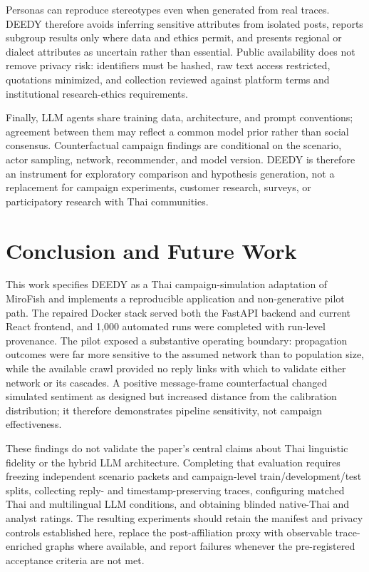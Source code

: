 \documentclass[conference]{IEEEtran}
\begin{document}
Personas can reproduce stereotypes even when generated from real traces.
DEEDY therefore avoids inferring sensitive attributes from isolated posts,
reports subgroup results only where data and ethics permit, and presents
regional or dialect attributes as uncertain rather than essential. Public
availability does not remove privacy risk: identifiers must be hashed, raw
text access restricted, quotations minimized, and collection reviewed against
platform terms and institutional research-ethics requirements.

Finally, LLM agents share training data, architecture, and prompt conventions;
agreement between them may reflect a common model prior rather than social
consensus. Counterfactual campaign findings are conditional on the scenario,
actor sampling, network, recommender, and model version. DEEDY is therefore an
instrument for exploratory comparison and hypothesis generation, not a
replacement for campaign experiments, customer research, surveys, or
participatory research with Thai communities.

\section{Conclusion and Future Work}

This work specifies DEEDY as a Thai campaign-simulation adaptation of MiroFish
and implements a reproducible application and non-generative pilot path. The
repaired Docker stack served both the FastAPI backend and current React
frontend, and 1,000 automated runs were completed with run-level provenance.
The pilot exposed a substantive operating boundary: propagation outcomes were
far more sensitive to the assumed network than to population size, while the
available crawl provided no reply links with which to validate either network
or its cascades. A positive message-frame counterfactual changed simulated
sentiment as designed but increased distance from the calibration distribution;
it therefore demonstrates pipeline sensitivity, not campaign effectiveness.

These findings do not validate the paper's central claims about Thai linguistic
fidelity or the hybrid LLM architecture. Completing that evaluation requires
freezing independent scenario packets and campaign-level train/development/test
splits, collecting reply- and timestamp-preserving traces, configuring matched
Thai and multilingual LLM conditions, and obtaining blinded native-Thai and
analyst ratings. The resulting experiments should retain the manifest and
privacy controls established here, replace the post-affiliation proxy with
observable trace-enriched graphs where available, and report failures whenever
the pre-registered acceptance criteria are not met.



\end{document}
